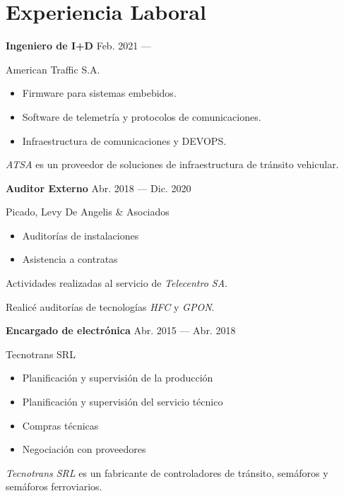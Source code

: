\section{Experiencia Laboral}

\parbox[t][][t]{\linewidth}{
	\parbox{\linewidth}{
		\textbf{Ingeniero de I+D}
			\hfill
			{Feb. 2021 --- \phantom{Dic. 2021}}
		}
	\smallbreak
	\parbox{\linewidth}{American Traffic S.A.}
	\smallbreak
	\begin{itemize}
	    \item{Firmware para sistemas embebidos.}
	    \item{Software de telemetría y protocolos de comunicaciones.}
        \item{Infraestructura de comunicaciones y DEVOPS.}
	\end{itemize}
	\smallbreak
    \emph{ATSA} es un proveedor de soluciones de infraestructura de tránsito vehicular.
}

\bigskip
\parbox[t][][t]{\linewidth}{
	\parbox{\linewidth}{
		\textbf{Auditor Externo}
			\hfill
			{Abr. 2018 --- Dic. 2020}
		}
	\smallbreak
	\parbox{\linewidth}{Picado, Levy De Angelis \& Asociados}
	\smallbreak
	\begin{itemize}
	    \item{Auditorías de instalaciones}
	    \item{Asistencia a contratas}
	\end{itemize}
	\smallbreak
	Actividades realizadas al servicio de \emph{Telecentro SA}.

    Realicé auditorías de tecnologías \emph{HFC} y \emph{GPON}.
}

\bigskip
\parbox[t][][t]{\linewidth}{
	{\parbox{\linewidth}{
		\parbox{\linewidth}{
			\textbf{Encargado de electrónica}
			\hfill
			{Abr. 2015 --- Abr. 2018}
		}
	}}
	\smallbreak
	\parbox{\linewidth}{Tecnotrans SRL}
	\smallbreak
	\begin{itemize}
	    \item{Planificación y supervisión de la producción}
	    \item{Planificación y supervisión del servicio técnico}
	    \item{Compras técnicas}
	    \item{Negociación con proveedores}
	\end{itemize}
	\smallbreak
	\emph{Tecnotrans SRL} es un fabricante de controladores de tránsito, semáforos y semáforos ferroviarios.
}

